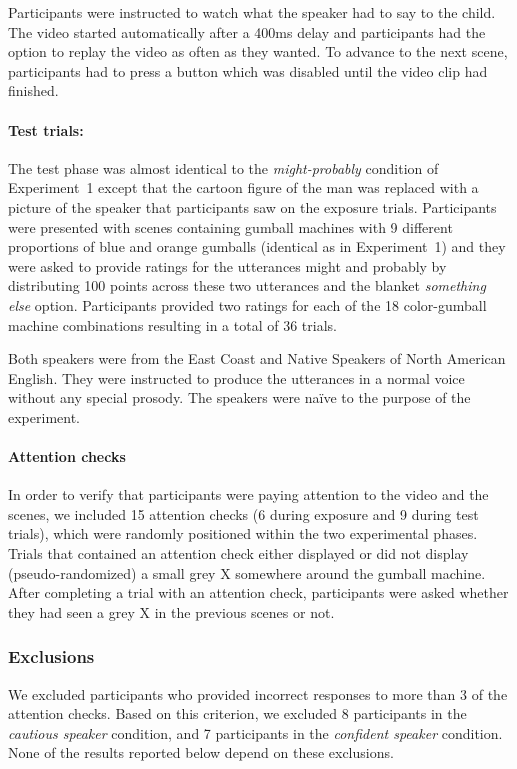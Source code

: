 \documentclass[man, floatsintext]{apa6}
\begin{document}
Participants were instructed to watch what the speaker had to say to the child. The video started automatically after a 400ms delay and participants had the option to replay the video as often as they wanted. To advance to the next scene, participants had to press a button which was disabled until the video clip had finished.

\paragraph{Test trials:} The test phase was almost identical to the  \textit{might-probably} condition of Experiment~1 except that the cartoon figure of the man was replaced with a picture of the speaker that participants saw on the exposure trials. Participants were presented with scenes containing gumball machines with 9 different proportions of blue and orange gumballs  (identical as in Experiment~1) and they were asked to provide ratings for the utterances {\sc might} and {\sc probably} by distributing 100 points across these two utterances and the blanket {\it something else} option. Participants provided two ratings for each of the 18 color-gumball machine combinations resulting in a total of 36 trials. 

Both speakers were from the East Coast and Native Speakers of North American English.
They were instructed to produce the utterances in a normal voice without any special prosody. The speakers were
na\"ive to the purpose of the experiment.


\paragraph{Attention checks}  In order to verify that participants were paying attention to the video and the scenes, we included 15 attention checks (6 during exposure and 9 during test trials), which were randomly positioned within the two experimental phases. Trials that contained an attention check either displayed or did not display (pseudo-randomized) a small grey X somewhere around the gumball machine. After completing a trial with an attention check, participants were asked whether they had seen a grey X in the previous scenes or not.

\subsubsection{Exclusions} We excluded participants who provided incorrect responses to more than 3 of the attention checks. Based on this criterion, we excluded 8 participants in the \textit{cautious speaker} condition, and 7 participants in the \textit{confident speaker} condition. None of the results reported below depend on these exclusions.
\end{document}

